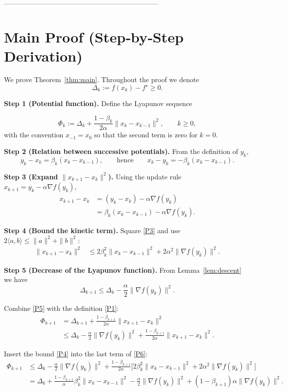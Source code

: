 \documentclass[11pt]{article}
\begin{document}
--------------------------------------------------------------------

\section*{Main Proof (Step‑by‑Step Derivation)}
We prove Theorem~\ref{thm:main}.  Throughout the proof we denote
\[
\Delta_k:=f(x_k)-f^\star\ge0.
\]

\noindent\textbf{Step 1 (Potential function).}  
Define the Lyapunov sequence  

\[
\Phi_k:=\Delta_k+\frac{1-\beta_k}{2\alpha}\|x_k-x_{k-1}\|^{2},
\qquad k\ge0,
\tag{P1}
\]
with the convention $x_{-1}=x_0$ so that the second term is zero for $k=0$.

\noindent\textbf{Step 2 (Relation between successive potentials).}  
From the definition of $y_k$,
\[
y_k-x_k=\beta_k (x_k-x_{k-1}),
\qquad\text{hence}\qquad
x_k-y_k=-\beta_k (x_k-x_{k-1}). \tag{P2}
\]

\noindent\textbf{Step 3 (Expand $\|x_{k+1}-x_k\|^{2}$).}  
Using the update rule $x_{k+1}=y_k-\alpha\nabla f(y_k)$,
\[
\begin{aligned}
x_{k+1}-x_k
&= (y_k-x_k)-\alpha\nabla f(y_k)\\
&= \beta_k (x_k-x_{k-1})-\alpha\nabla f(y_k). \tag{P3}
\end{aligned}
\]

\noindent\textbf{Step 4 (Bound the kinetic term).}  
Square \eqref{P3} and use $2\langle a,b\rangle\le\|a\|^{2}+\|b\|^{2}$:
\[
\begin{aligned}
\|x_{k+1}-x_k\|^{2}
&\le 2\beta_k^{2}\|x_k-x_{k-1}\|^{2}
   +2\alpha^{2}\|\nabla f(y_k)\|^{2}. \tag{P4}
\end{aligned}
\]

\noindent\textbf{Step 5 (Decrease of the Lyapunov function).}  
From Lemma~\ref{lem:descent} we have
\[
\Delta_{k+1}\le\Delta_k-\frac{\alpha}{2}\|\nabla f(y_k)\|^{2}. \tag{P5}
\]

Combine \eqref{P5} with the definition \eqref{P1}:
\[
\begin{aligned}
\Phi_{k+1}
&= \Delta_{k+1}
   +\frac{1-\beta_{k+1}}{2\alpha}\|x_{k+1}-x_k\|^{2}\\
&\le \Delta_k-\frac{\alpha}{2}\|\nabla f(y_k)\|^{2}
   +\frac{1-\beta_{k+1}}{2\alpha}\|x_{k+1}-x_k\|^{2}.
\end{aligned}
\tag{P6}
\]

Insert the bound \eqref{P4} into the last term of \eqref{P6}:
\[
\begin{aligned}
\Phi_{k+1}
&\le \Delta_k-\frac{\alpha}{2}\|\nabla f(y_k)\|^{2}
   +\frac{1-\beta_{k+1}}{2\alpha}
     \bigl[2\beta_k^{2}\|x_k-x_{k-1}\|^{2}
           +2\alpha^{2}\|\nabla f(y_k)\|^{2}\bigr] \\[1mm]
&= \Delta_k
   +\frac{1-\beta_{k+1}}{\alpha}\beta_k^{2}\|x_k-x_{k-1}\|^{2}
   -\frac{\alpha}{2}\|\nabla f(y_k)\|^{2}
   +(1-\beta_{k+1})\alpha\|\nabla f(y_k)\|^{2}.
\end{aligned}
\tag{P7}
\]
\end{document}
